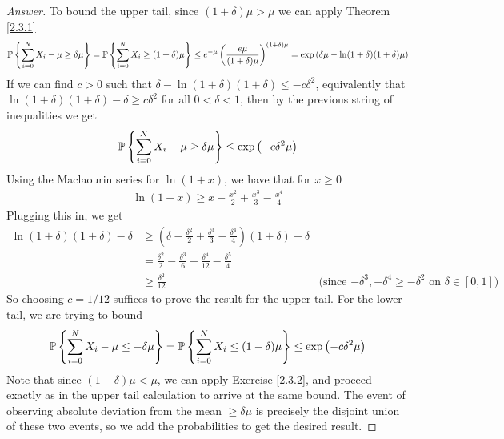 {\begin{proof}[Answer]
    To bound the upper tail, since $(1+\delta) \mu > \mu$ we can apply Theorem \ref{2.3.1}
\begin{align*}
    \mathbb{P} \left\{\sum_{i=0}^N X_i - \mu \geq \delta \mu\right\} = 
    \mathbb{P} \left\{\sum_{i=0}^N X_i \geq (1+\delta) \mu\right\} \leq e^{-\mu}\left(\frac {e\mu} {(1+\delta)\mu}\right)^{(1+\delta)\mu} = \exp\left(\delta\mu - \ln (1+\delta)(1+\delta)\mu\right)
\end{align*}
If we can find $c>0$ such that $\delta - \ln(1+\delta)(1+\delta) \leq -c\delta^2$, equivalently that $\ln(1+\delta)(1+\delta) - \delta \geq c\delta^2$ for all $0 < \delta < 1$, then by the previous string of inequalities we get
\begin{align*}
    \mathbb{P} \left\{\sum_{i=0}^N X_i - \mu \geq \delta \mu\right\} \leq \exp\left(-c\delta^2\mu\right)
\end{align*}
Using the Maclaourin series for $\ln(1+x)$, we have that for $x \geq 0$
\begin{align*}
    \ln (1 + x) \geq x - \frac {x^2} 2 + \frac {x^3} 3 - \frac {x^4}4 
\end{align*}
Plugging this in, we get
\begin{align*}
    \ln(1+\delta)(1+\delta) - \delta &\geq (\delta - \frac {\delta^2} 2 + \frac {\delta^3} 3 - \frac {\delta^4}4 )(1+\delta) - \delta \\
    &=\frac{\delta^2} 2 - \frac{\delta^3} 6 + \frac {\delta^4} {12} - \frac{\delta^5} 4 \\
    &\geq \frac {\delta^2} {12} &\text{(since $-\delta^3, -\delta^4 \geq -\delta^2$ on $\delta \in [0,1]$)}
\end{align*}
So choosing $c = 1/12$ suffices to prove the result for the upper tail. For the lower tail, we are trying to bound
\begin{align*}
    \mathbb{P} \left\{\sum_{i=0}^N X_i - \mu \leq -\delta \mu\right\} = 
    \mathbb{P} \left\{\sum_{i=0}^N X_i \leq (1-\delta) \mu\right\} \leq \exp \left(-c\delta^2\mu\right)
\end{align*} 
Note that since $(1-\delta)\mu < \mu$, we can apply Exercise \ref{2.3.2}, and proceed exactly as in the upper tail calculation to arrive at the same bound. The event of observing absolute deviation from the mean $\geq \delta\mu$ is precisely the disjoint union of these two events, so we add the probabilities to get the desired result.

\end{proof}

}

